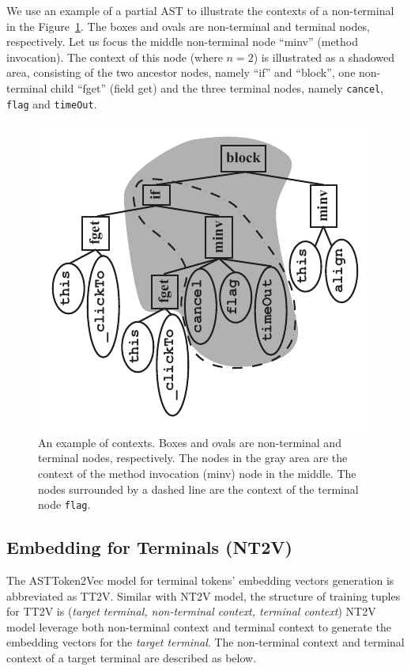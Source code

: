 \documentclass[E]{compsoft}
\begin{document}
We use an example of a partial AST to illustrate the contexts of a non-terminal in the Figure~\ref{fig:node2vec-context}. The boxes and ovals are non-terminal and terminal nodes, respectively.  
Let us focus the middle non-terminal node ``minv'' (method invocation).  The context of this node (where $n=2$) is illustrated as a shadowed area, consisting of the two ancestor nodes, namely ``if'' and ``block'', one non-terminal child ``fget'' (field get) and the three terminal nodes, namely \texttt{cancel}, \texttt{flag} and \texttt{timeOut}.

\begin{figure}[!ht]
\centering
\includegraphics[scale=0.9]{pictures/ast-context.pdf}
\caption{An example of contexts.  Boxes and ovals are non-terminal and terminal nodes, respectively.  The nodes in the gray area are the context of the method invocation (minv) node in the middle.  The nodes surrounded by a dashed line are the context of the terminal node \texttt{flag}.}
\label{fig:node2vec-context}
\end{figure}





\subsection{Embedding for Terminals (NT2V)}
\label{sub:embedding_tt}
The ASTToken2Vec model for terminal tokens' embedding vectors generation is abbreviated as TT2V.
Similar with NT2V model, the structure of training tuples for TT2V is (\textit{target terminal, non-terminal context, terminal context}) 
NT2V model leverage both non-terminal context and terminal context to generate the embedding vectors for the \textit{target terminal}.
The non-terminal context and terminal context of a target terminal are described as below.
\end{document}
